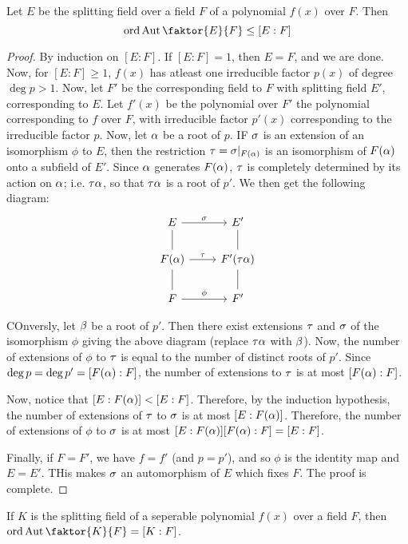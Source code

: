 \begin{lemma}\label{2.1.5}
    Let $E$ be the splitting field over a field $F$ of a polynomial $f(x)$ over
    $F$. Then
    \begin{equation*}
        \ord{\Aut{\faktor{E}{F}}} \leq [E:F]
    \end{equation*}
\end{lemma}
\begin{proof}
    By induction on $[E:F]$. If $[E:F]=1$, then $E=F$, and we are done. Now, for
     $[E:F] \geq 1$, $f(x)$ has atleast one irreducible factor $p(x)$ of degree
     $\deg{p}>1$. Now, let $F'$ be the corresponding field to $F$ with splitting
     field $E'$, corresponding to  $E$. Let  $f'(x)$ be the polynomial over $F'$
     the polynomial corresponding to $f$ over $F$, with irreducible factor
     $p'(x)$ corresponding to the irreducible factor $p$. Now, let  $\alpha$ be a
     root of  $p$. IF  $\sigma$ is an extension of an isomorphism $\phi$ to $E$,
     then the restriction $\tau=\sigma|_{F(\alpha)}$ is an isomorphism of $F(\alpha)$ onto a
     subfield of $E'$. Since $\alpha$ generates $F(\alpha)$, $\tau$ is completely
     determined by its action on  $\alpha$; i.e.  $\tau\alpha$, so that  $\tau\alpha$ is a root
     of  $p'$. We then get the following diagram:
     \[\begin{tikzcd}
        E & {E'} \\
        {F(\alpha)} & {F'(\tau\alpha)} \\ F & {F'}
        \arrow["\sigma", from=1-1, to=1-2]
        \arrow["\tau", from=2-1, to=2-2]
        \arrow["\phi", from=3-1, to=3-2]
        \arrow[no head, from=1-1, to=2-1]
        \arrow[no head, from=2-1, to=3-1]
        \arrow[no head, from=1-2, to=2-2]
        \arrow[no head, from=2-2,to=3-2]
    \end{tikzcd}\]

    COnversly, let  $\beta$ be a root of  $p'$. Then there exist extensions  $\tau$
    and  $\sigma$ of the isomorphism  $\phi$ giving the above diagram  (replace
    $\tau\alpha$ with  $\beta$). Now, the number of extensions of $\phi$ to  $\tau$ is
    equal to the number of distinct roots of  $p'$. Since
    $\deg{p}=\deg{p'}=[F(\alpha):F]$, the number of extensions to $\tau$ is at most
    $[F(\alpha):F]$.

    Now, notice that $[E:F(\alpha)]<[E:F]$. Therefore, by the induction hypothesis,
    the number of extensions of $\tau$ to  $\sigma$ is at most $[E:F(\alpha)]$. Therefore,
    the number of extensions of $\phi$ to  $\sigma$ is at most
    $[E:F(\alpha)][F(\alpha):F]=[E:F]$.

    Finally, if $F=F'$, we have  $f=f'$ (and $p=p'$), and so $\phi$ is the
    identity map and  $E=E'$. THis makes $\sigma$ an automorphism of $E$ which fixes
     $F$. The proof is complete.
\end{proof}
\begin{corollary}
    If $K$ is the splitting field of a seperable polynomial $f(x)$ over a field
    $F$, then $\ord{\Aut{\faktor{K}{F}}}=[K:F]$.
\end{corollary}

